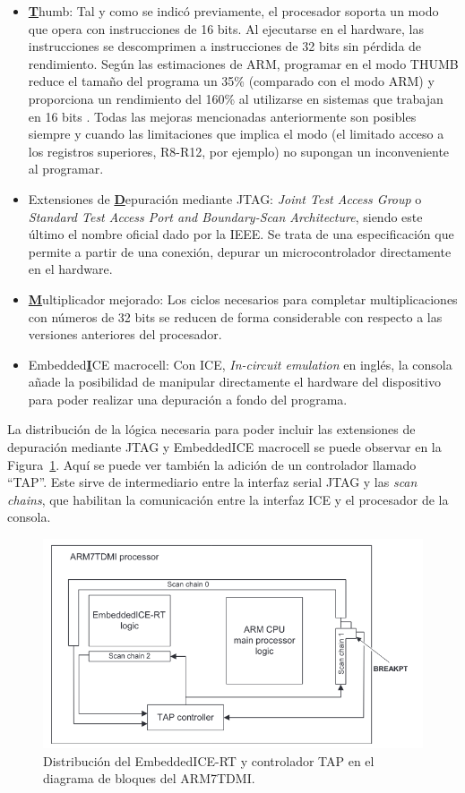 \begin{enumerate}
		\begin{itemize}
			\item \underline{\textbf{T}}humb: Tal y como se indicó previamente, el procesador soporta un modo que opera con instrucciones de 16 bits. Al ejecutarse en el hardware, las instrucciones se descomprimen a instrucciones de 32 bits sin pérdida de rendimiento. Según las estimaciones de ARM, programar en el modo THUMB reduce el tamaño del programa un 35\% (comparado con el modo ARM) y proporciona un rendimiento del 160\% al utilizarse en sistemas que trabajan en 16 bits \cite{bib:arm}. Todas las mejoras mencionadas anteriormente son posibles siempre y cuando las limitaciones que implica el modo (el limitado acceso a los registros superiores, R8-R12, por ejemplo) no supongan un inconveniente al programar.
			\item Extensiones de \underline{\textbf{D}}epuración mediante JTAG: \textit{Joint Test Access Group} o \textit{Standard Test Access Port and Boundary-Scan Architecture}, siendo este último el nombre oficial dado por la IEEE. Se trata de una especificación que permite a partir de una conexión, depurar un microcontrolador directamente en el hardware.
		\item \underline{\textbf{M}}ultiplicador mejorado: Los ciclos necesarios para completar multiplicaciones con números de 32 bits se reducen de forma considerable con respecto a las versiones anteriores del procesador.
		\item Embedded\underline{\textbf{I}}CE macrocell: Con ICE, \textit{In-circuit emulation} en inglés, la consola añade la posibilidad de manipular directamente el hardware del dispositivo para poder realizar una depuración a fondo del programa.
		\end{itemize}

		La distribución de la lógica necesaria para poder incluir las extensiones de depuración mediante JTAG y EmbeddedICE macrocell se puede observar en la Figura~\ref{fig:debug_block}. Aquí se puede ver también la adición de un controlador llamado ``TAP''. Este sirve de intermediario entre la interfaz serial JTAG y las \textit{scan chains}, que habilitan la comunicación entre la interfaz ICE y el procesador de la consola.

		\begin{figure}[h]
		    \centering
		    \includegraphics[width=.8\textwidth]{capitulos/capitulo2/debug_block.png}
		    \caption{Distribución del EmbeddedICE-RT y controlador TAP en el diagrama de bloques del ARM7TDMI.}
		    \label{fig:debug_block}
		\end{figure}
		\FloatBarrier{}


\end{enumerate}
